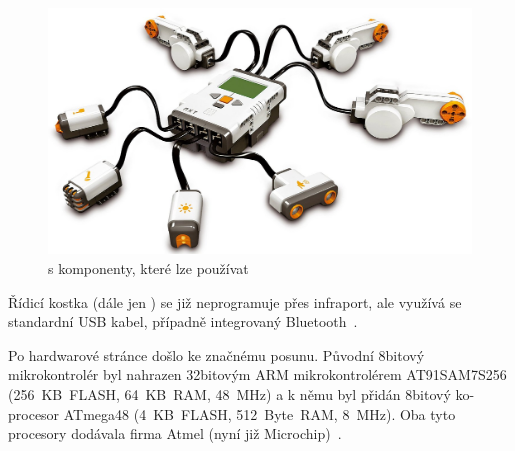 \begin{figure}[h]
	\centering
	\includegraphics[width=\textwidth]{images/lego-mindstorms-nxt_with-modules.jpg}
	\caption[\legoNXT{ }s komponenty, které lze používat]{\legoNXT{ }s komponenty, které lze používat\protect\footnotemark}
	\label{fig:lego-mindstorms-nxt_with-modules}
\end{figure}

Řídicí kostka (dále jen \brick{}) %
% 
% 
% 
%
%
se již neprogramuje přes infraport, ale využívá se standardní USB kabel, případně integrovaný Bluetooth~\cite{legoMindstormsNXT_hardware}.

Po hardwarové stránce došlo ke značnému posunu. Původní 8bitový mikrokontrolér byl nahrazen 32bitovým ARM mikrokontrolérem %
% 
% 
% 
%
%
AT91SAM7S256 (256~KB~FLASH, 64~KB~RAM, 48~MHz) a k němu byl přidán 8bitový ko-procesor ATmega48 (4~KB~FLASH, 512~Byte~RAM, 8~MHz). 
% 
% 
% 
%
%
Oba tyto procesory dodávala firma Atmel (nyní již Microchip)~\cite{legoMindstormsNXT_hardware}.



